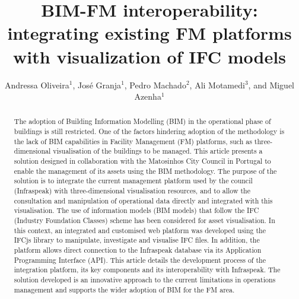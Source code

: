 \documentclass[a4paper, 10pt, twocolumn, twoside]{article}
\begin{document}
\linespread{0.5}

\title{BIM-FM interoperability: integrating existing FM platforms with visualization of IFC models}

\author{Andressa Oliveira$^{1}$, José Granja$^1$, Pedro Machado$^2$, Ali Motamedi$^3$, and Miguel Azenha$^1$}




\maketitle 
\thispagestyle{fancy} 
\pagestyle{fancy}



\begin{abstract}
The adoption of Building Information Modelling (BIM) in the operational phase of buildings is still restricted. One of the factors hindering adoption of the methodology is the lack of BIM capabilities in Facility Management (FM) platforms, such as three-dimensional visualisation of the buildings to be managed. This article presents a solution designed in collaboration with the Matosinhos City Council in Portugal to enable the management of its assets using the BIM methodology. The purpose of the solution is to integrate the current management platform used by the council (Infraspeak) with three-dimensional visualisation resources, and to allow the consultation and manipulation of operational data directly and integrated with this visualisation. The use of information models (BIM models) that follow the IFC (Industry Foundation Classes) scheme has been considered for asset visualisation. In this context, an integrated and customised web platform was developed using the IFCjs library to manipulate, investigate and visualise IFC files. In addition, the platform allows direct connection to the Infraspeak database via its Application Programming Interface (API). This article details the development process of the integration platform, its key components and its interoperability with Infraspeak. The solution developed is an innovative approach to the current limitations in operations management and supports the wider adoption of BIM for the FM area.
\end{abstract}
\end{document}
